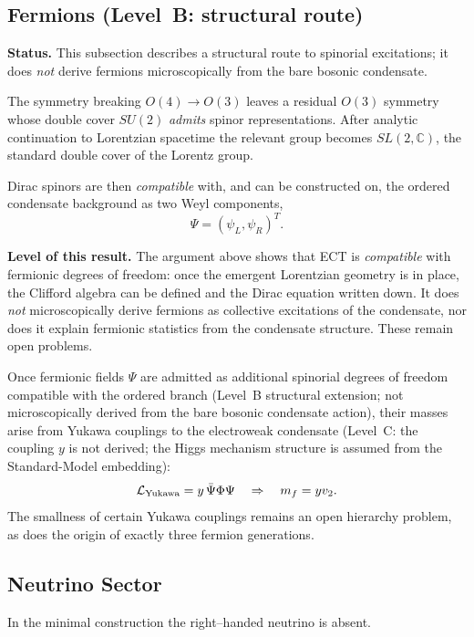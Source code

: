 \documentclass[11pt,a4paper]{article}
\numberwithin{equation}{section}
\begin{document}
\subsection{Fermions (Level~B: structural route)}

\textbf{Status.} This subsection describes a structural route to
spinorial excitations; it does \emph{not} derive fermions
microscopically from the bare bosonic condensate.

The symmetry breaking $O(4)\to O(3)$ leaves a residual $O(3)$
symmetry whose double cover $SU(2)$ \emph{admits} spinor representations.
After analytic continuation to Lorentzian spacetime the relevant group
becomes $SL(2,\mathbb{C})$, the standard double cover of the Lorentz group.

Dirac spinors are then \emph{compatible} with, and can be constructed on,
the ordered condensate background as two Weyl components,
\begin{equation}
\Psi = (\psi_L,\psi_R)^T.
\end{equation}

\textbf{Level of this result.}
The argument above shows that ECT is \emph{compatible} with fermionic
degrees of freedom: once the emergent Lorentzian geometry is in place,
the Clifford algebra can be defined and the Dirac equation written
down.  It does \emph{not} microscopically derive fermions as collective
excitations of the condensate, nor does it explain fermionic statistics
from the condensate structure.  These remain open problems.

Once fermionic fields $\Psi$ are admitted as additional spinorial
degrees of freedom compatible with the ordered branch
(Level~B structural extension; not microscopically derived from
the bare bosonic condensate action), their masses arise from
Yukawa couplings to the electroweak condensate
(Level~C: the coupling $y$ is not derived; the Higgs mechanism
structure is assumed from the Standard-Model embedding):
\begin{equation}
\mathcal{L}_{\rm Yukawa} = y\,\bar{\Psi}\Phi\Psi
\quad\Rightarrow\quad
m_f = y v_2.
\end{equation}
The smallness of certain Yukawa couplings remains an open hierarchy problem,
as does the origin of exactly three fermion generations.

\subsection{Neutrino Sector}

In the minimal construction the right–handed neutrino is absent.
\end{document}
